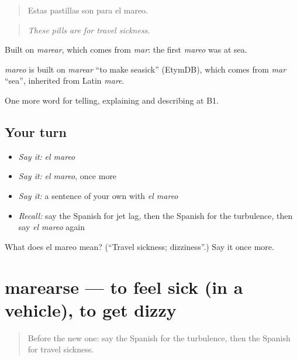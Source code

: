 \begin{quote}
Estas pastillas son para el mareo.
\end{quote}

\begin{quote}
\emph{These pills are for travel sickness.}
\end{quote}

Built on \emph{marear}, which comes from \emph{mar}: the first \emph{mareo} was at sea.

\begin{cousinweb}
\emph{mareo} is built on \emph{marear} \textquotedblleft{}to make seasick\textquotedblright{} (EtymDB), which comes from \emph{mar} \textquotedblleft{}sea\textquotedblright{}, inherited from Latin \emph{mare}.
\end{cousinweb}

\begin{grammarlens}[title={What you've built}]
One more word for telling, explaining and describing at B1.
\end{grammarlens}

\subsection*{Your turn}
\begin{itemize}
\raggedright
  \item \emph{Say it:} \emph{el mareo}
  \item \emph{Say it:} \emph{el mareo}, once more
  \item \emph{Say it:} a sentence of your own with \emph{el mareo}
  \item \emph{Recall:} say the Spanish for jet lag, then the Spanish for the turbulence, then say \emph{el mareo} again
\end{itemize}

\begin{tcolorbox}[breakable,colback=teal!4,colframe=teal!35!black,title={Before you move on}]
What does el mareo mean? (\textquotedblleft{}Travel sickness; dizziness\textquotedblright{}.) Say it once more.
\end{tcolorbox}
\section[marearse]{marearse — to feel sick (in a vehicle), to get dizzy}

\label{lesson:ES-C655-marearse}



\begin{quote}
Before the new one: say the Spanish for the turbulence, then the Spanish for travel sickness.
\end{quote}

